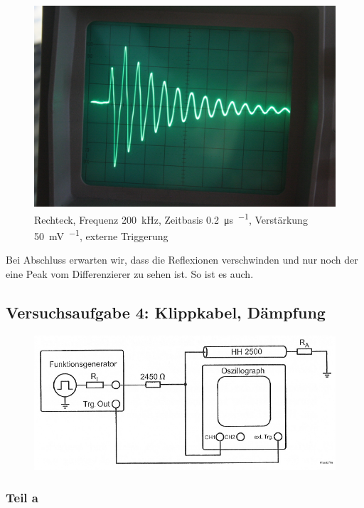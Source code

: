 \begin{figure}[htbp]
	\centering
	\begin{minipage}{.45\linewidth}
	\includegraphics[width=\linewidth]{Fotos/IMG_0772-1500.jpg}
	\end{minipage}
	\caption{%
		Rechteck, Frequenz \SI{200}{\kilo\hertz},
		Zeitbasis \SI{.2}{\micro\second\per\division},
		Verstärkung \SI{50}{\milli\volt\per\division},
		externe Triggerung
	}
	\label{fig:0772}
\end{figure}

Bei Abschluss erwarten wir, dass die Reflexionen verschwinden und nur noch der
eine Peak vom Differenzierer zu sehen ist. So ist es auch.

\FloatBarrier
\subsection{Versuchsaufgabe 4: Klippkabel, Dämpfung}

\begin{figure}[htbp]
	\centering
	\includegraphics[width=.7\textwidth]{Schaltplan/1-9.png}
	\caption{%
		\cite[Abbildung~1.9]{physik313-Anleitung}
	}
	\label{fig:1-9}
\end{figure}

\FloatBarrier
\subsubsection{Teil a}

